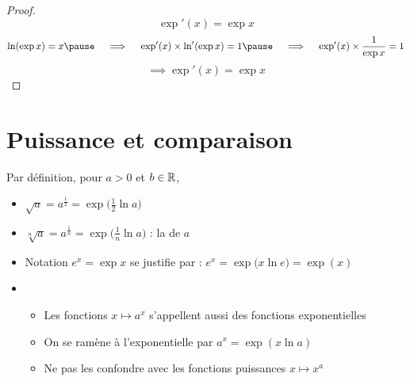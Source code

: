 \begin{frame}

\begin{proof}
$$\exp'(x) = \exp x$$\pause
$$\ln(\exp x)=x 
\pause \quad \implies\quad  \exp'(x) \times \ln'(\exp x) = 1 
\pause \quad \implies\quad  \exp'(x) \times \frac{1}{\exp x} = 1$$
\pause$$\implies \exp'(x) = \exp x$$
\end{proof}

\medskip

\begin{minipage}{0.6\textwidth}
\begin{itemize}
  
\end{itemize}  
\end{minipage}
\begin{minipage}{0.29\textwidth}
\end{minipage}



\end{frame}



\section{Puissance et comparaison}

\begin{frame}


Par définition, pour $a>0$ et $b\in \mathbb{R}$,

\pause

\begin{remarque}
\begin{itemize}\setlength{\itemsep}{7pt} 
  \item $\sqrt a = a^\frac12 = \exp\big( \frac12 \ln a\big)$
\pause
  \item $\sqrt[n] a = a^\frac1n = \exp\big( \frac1n \ln a\big)$ : la  de $a$
\pause  
  \item Notation $e^x = \exp x$ se justifie par : $e^x =  \exp\big(x \ln e \big) = \exp(x)$
\pause
  \item 
  \begin{itemize}
    \item Les fonctions $x \mapsto a^x$ s'appellent aussi des fonctions exponentielles
\pause    
    \item On se ramène à l'exponentielle par $a^x = \exp(x \ln a)$
\pause    
    \item Ne pas les confondre avec les fonctions puissances $x \mapsto x^a$
  \end{itemize}
\end{itemize}
\end{remarque}

\end{frame}


